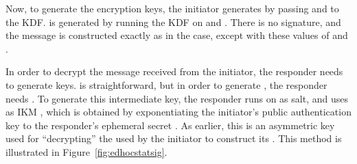 {Now, to generate the encryption keys, the initiator generates \mKthreem{} by
passing \mPRKfour{} and \mTHthree{} to the KDF. \mKthreeae{} is generated by
running the KDF on \mPRKthree{} and \mTHthree. There is no signature, and the
message is constructed exactly as in the \mStatStat{} case, except with these
values of \mKthreem{} and \mKthreeae.

In order to decrypt the message received from the initiator, the responder needs
to generate keys. \mKthreeae{} is straightforward, but in order to generate
\mKthreem, the responder needs \mPRKfour. To generate this intermediate key, the
responder runs \mHkdfExtract{} on \mPRKthree{} as salt, and uses as IKM \mGiy,
which is obtained by exponentiating the initiator's public authentication key to
the responder's ephemeral secret \mGy. As earlier, this is an asymmetric key
used for ``decrypting'' the \mGiy{} used by the initiator to construct its \mPRKfour. This method is illustrated in Figure~\ref{fig:edhocstatsig}.

}
